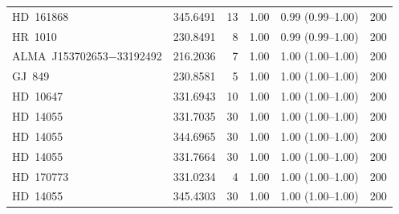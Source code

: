 \begin{tabular}{@{}l@{~~}r@{~~}r@{~~}r@{~~}l@{~~}r@{}}
HD~161868 & 345.6491 & 13 & 1.00 & 0.99 (0.99--1.00) & 200 \\
HR~1010 & 230.8491 & 8 & 1.00 & 0.99 (0.99--1.00) & 200 \\
ALMA~J153702653$-$33192492 & 216.2036 & 7 & 1.00 & 1.00 (1.00--1.00) & 200 \\
GJ~849 & 230.8581 & 5 & 1.00 & 1.00 (1.00--1.00) & 200 \\
HD~10647 & 331.6943 & 10 & 1.00 & 1.00 (1.00--1.00) & 200 \\
HD~14055 & 331.7035 & 30 & 1.00 & 1.00 (1.00--1.00) & 200 \\
HD~14055 & 344.6965 & 30 & 1.00 & 1.00 (1.00--1.00) & 200 \\
HD~14055 & 331.7664 & 30 & 1.00 & 1.00 (1.00--1.00) & 200 \\
HD~170773 & 331.0234 & 4 & 1.00 & 1.00 (1.00--1.00) & 200 \\
HD~14055 & 345.4303 & 30 & 1.00 & 1.00 (1.00--1.00) & 200 \\
\hline
\end{tabular}

